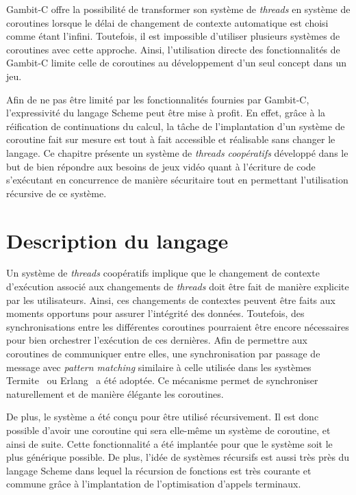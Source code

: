 \documentclass[12pt,twoside,letterpaper,francais]{book}
\begin{document}
Gambit-C offre la possibilité de transformer son système de
\textit{threads} en système de coroutines lorsque le délai de
changement de contexte automatique est choisi comme étant
l'infini. Toutefois, il est impossible d'utiliser plusieurs systèmes
de coroutines avec cette approche. Ainsi, l'utilisation directe des
fonctionnalités de Gambit-C limite celle de coroutines au
dévelop\-pement d'un seul concept dans un jeu.

Afin de ne pas être limité par les fonctionnalités fournies par
Gambit-C, l'expressivité du langage Scheme peut être mise à
profit. En effet, grâce à la réification de continuations du calcul,
la tâche de l'implantation d'un système de coroutine fait sur mesure
est tout à fait accessible et réalisable sans changer le langage. Ce
chapitre présente un système de \textit{threads} \emph{coopératifs}
développé dans le but de bien répondre aux besoins de jeux vidéo quant
à l'écriture de code s'exécutant en concurrence de manière sécuritaire
tout en permettant l'utilisation récursive de ce système.


\FloatBarrier
\section{Description du langage}
Un système de \textit{threads} coopératifs implique que le changement
de contexte d'exécution associé aux changements de \textit{threads}
doit être fait de manière explicite par les utilisateurs. Ainsi, ces
changements de contextes peuvent être faits aux moments opportuns pour
assurer l'intégrité des données. Toutefois, des synchronisations entre
les différentes coroutines pourraient être encore nécessaires pour
bien orchestrer l'exécution de ces dernières. Afin de permettre aux
coroutines de communiquer entre elles, une synchronisation par passage
de message avec \textit{pattern matching} similaire à celle utilisée
dans les systèmes Termite~\cite{Termite_paper} ou Erlang~\cite{Erlang}
a été adoptée. Ce mécanisme permet de synchroniser naturellement et de
manière élégante les coroutines.

De plus, le système a été conçu pour être utilisé récursivement. Il
est donc possible d'avoir une coroutine qui sera elle-même un système
de coroutine, et ainsi de suite. Cette fonctionnalité a été implantée
pour que le système soit le plus générique possible. De plus, l'idée
de systèmes récursifs est aussi très près du langage Scheme dans
lequel la récursion de fonctions est très courante et commune grâce à
l'implantation de l'optimisation d'appels terminaux.
\end{document}
